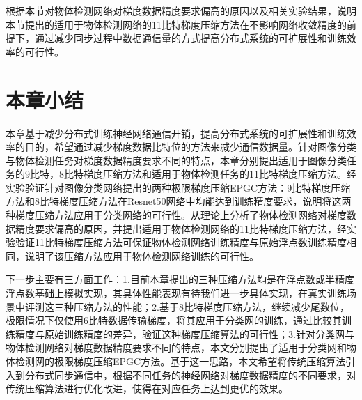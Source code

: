 根据本节对物体检测网络对梯度数据精度要求偏高的原因以及相关实验结果，说明本节提出的适用于物体检测网络的11比特梯度压缩方法在不影响网络收敛精度的前提下，通过减少同步过程中数据通信量的方式提高分布式系统的可扩展性和训练效率的可行性。

\section{本章小结}

本章基于减少分布式训练神经网络通信开销，提高分布式系统的可扩展性和训练效率的目的，希望通过减少梯度数据比特位的方法来减少通信数据量。针对图像分类与物体检测任务对梯度数据精度要求不同的特点，本章分别提出适用于图像分类任务的9比特，8比特梯度压缩方法和适用于物体检测任务的11比特梯度压缩方法。经实验验证针对图像分类网络提出的两种极限梯度压缩EPGC方法：9比特梯度压缩方法和8比特梯度压缩方法在Resnet50网络中均能达到训练精度要求，说明将这两种梯度压缩方法应用于分类网络的可行性。从理论上分析了物体检测网络对梯度数据精度要求偏高的原因，并提出适用于物体检测网络的11比特梯度压缩方法，经实验验证11比特梯度压缩方法可保证物体检测网络训练精度与原始浮点数训练精度相同，说明了该压缩方法应用于物体检测网络训练的可行性。

下一步主要有三方面工作：1.目前本章提出的三种压缩方法均是在浮点数或半精度浮点数基础上模拟实现，其具体性能表现有待我们进一步具体实现，在真实训练场景中评测这三种压缩方法的性能；2.基于8比特梯度压缩方法，继续减少尾数位，极限情况下仅使用6比特数据传输梯度，将其应用于分类网的训练，通过比较其训练精度与原始训练精度的差异，验证这种梯度压缩算法的可行性；3.针对分类网与物体检测网络对梯度数据精度要求不同的特点，本文分别提出了适用于分类网和物体检测网的极限梯度压缩EPGC方法。基于这一思路，本文希望将传统压缩算法引入到分布式同步通信中，根据不同任务的神经网络对梯度数据精度的不同要求，对传统压缩算法进行优化改进，使得在对应任务上达到更优的效果。



